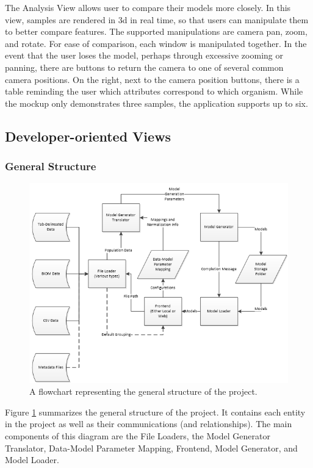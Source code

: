 \documentclass[letterpaper,10pt, onecolumn, draftclsnofoot]{IEEEtran}
\begin{document}
The Analysis View allows user to compare their models more closely. In this view, samples are rendered in 3d in real time, so that users can manipulate them to better compare features. The supported manipulations are camera pan, zoom, and rotate. For ease of comparison, each window is manipulated together. In the event that the user loses the model, perhaps through excessive zooming or panning, there are buttons to return the camera to one of several common camera positions. On the right, next to the camera position buttons, there is a table reminding the user which attributes correspond to which organism. While the mockup only demonstrates three samples, the application supports up to six.

\subsection{Developer-oriented Views}
\subsubsection{General Structure}
\begin{figure}[h]
	\includegraphics[width=\textwidth]{structure.PNG}
	\caption{A flowchart representing the general structure of the project.}
	\label{fig:structure}
\end{figure}

Figure \ref{fig:structure} summarizes the general structure of the project. It contains each entity in the project as well as their communications (and relationships). The main components of this diagram are the File Loaders, the Model Generator Translator, Data-Model Parameter Mapping, Frontend, Model Generator, and Model Loader.
\end{document}
